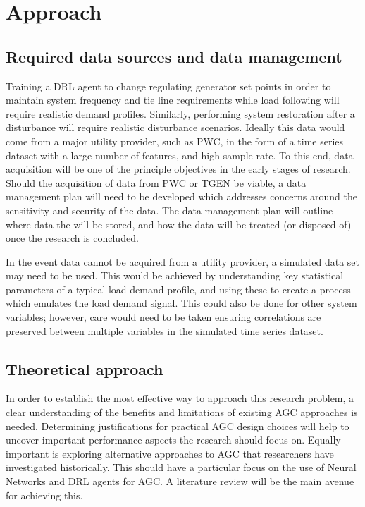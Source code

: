 \section{Approach}

\subsection{Required data sources and data management}\label{datamanagement}
Training a DRL agent to change regulating generator set points in order to maintain system frequency and tie line requirements while load following will require realistic demand profiles. Similarly, performing system restoration after a disturbance will require realistic disturbance scenarios. Ideally this data would come from a major utility provider, such as PWC, in the form of a time series dataset with a large number of features, and high sample rate. To this end, data acquisition will be one of the principle objectives in the early stages of research. Should the acquisition of data from PWC or TGEN be viable, a data management plan will need to be developed which addresses concerns around the sensitivity and security of the data. The data management plan will outline where data the will be stored, and how the data will be treated (or disposed of) once the research is concluded.

In the event data cannot be acquired from a utility provider, a simulated data set may need to be used. This would be achieved by understanding key statistical parameters of a typical load demand profile, and using these to create a process which emulates the load demand signal. This could also be done for other system variables; however, care would need to be taken ensuring correlations are preserved between multiple variables in the simulated time series dataset.

\subsection{Theoretical approach}
In order to establish the most effective way to approach this research problem, a clear understanding of the benefits and limitations of existing AGC approaches is needed. Determining justifications for practical AGC design choices will help to uncover important performance aspects the research should focus on. Equally important is exploring alternative approaches to AGC that researchers have investigated historically. This should have a particular focus on the use of Neural Networks and DRL agents for AGC. A literature review will be the main avenue for achieving this.

